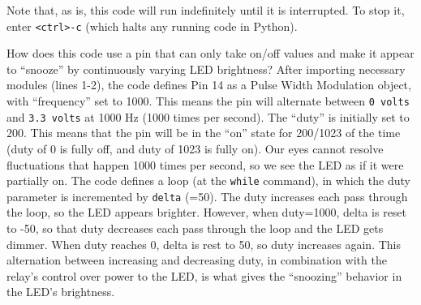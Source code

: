 Note that, as is, this code will run indefinitely until it is interrupted. 
To stop it, enter \texttt{<ctrl>-c} (which halts any running code in Python). 
	\begin{kaobox}[frametitle=Asleep at the switch!]
		How does this code use a pin that can only take on/off values and make it appear to ``snooze'' by continuously varying LED brightness? 
		After importing necessary modules (lines 1-2), the code defines Pin 14 as a Pulse Width Modulation object, with ``frequency'' set to 1000. 
		This means the pin will alternate between \texttt{0 volts} and \texttt{3.3 volts} at 1000 Hz (1000 times per second). 
		The ``duty'' is initially set to 200. 
		This means that the pin will be in the ``on'' state for 200/1023 of the time (duty of 0 is fully off, and duty of 1023 is fully on). 
		Our eyes cannot resolve fluctuations that happen 1000 times per second, so we see the LED as if it were partially on.
		The code defines a loop (at the \texttt{while} command), in which the duty parameter is incremented by \texttt{delta} (=50). 
		The duty increases each pass through the loop, so the LED appears brighter. 
		However, when duty=1000, delta is reset to -50, so that duty decreases each pass through the loop and the LED gets dimmer. 
		When duty reaches 0, delta is rest to 50, so duty increases again. 
		This alternation between increasing and decreasing duty, in combination with the relay's control over power to the LED, is what gives the ``snoozing'' behavior in the LED's brightness. 
	\end{kaobox}




